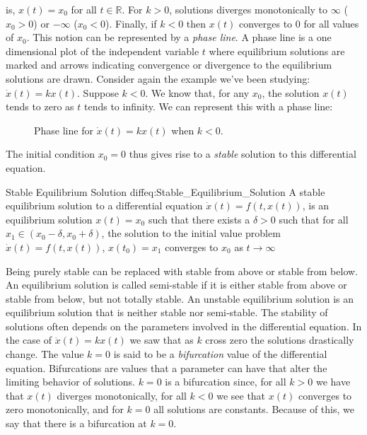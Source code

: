             is, $x(t)=x_{0}$ for all $t\in\mathbb{R}$. For $k>0$,
            solutions diverges monotonically to $\infty$
            ($x_{0}>0$) or $-\infty$ ($x_{0}<0$).
            Finally, if $k<0$ then $x(t)$ converges to $0$
            for all values of $x_{0}$. This notion can be represented
            by a \textit{phase line}. A phase line is a one
            dimensional plot of the independent variable $t$ where
            equilibrium solutions are marked and arrows indicating
            convergence or divergence to the equilibrium solutions
            are drawn. Consider again the example
            we've been studying:
            $\dot{x}(t)=kx(t)$. Suppose $k<0$. We know that, for any
            $x_{0}$, the solution $x(t)$ tends to zero as $t$ tends
            to infinity. We can represent this with a phase line:
            \begin{figure}
                \captionsetup{type=figure}
                \centering
                
                \caption{Phase line for $\dot{x}(t)=kx(t)$
                         when $k<0$.}
                \label{fig:CHAOS:Phase_Line_Example}
            \end{figure}
            The initial condition $x_{0}=0$ thus gives rise to a
            \textit{stable} solution to this differential equation.
            \begin{fdefinition}{Stable Equilibrium Solution}   
                {diffeq:Stable_Equilibrium_Solution}
                A stable equilibrium solution to a differential
                equation $\dot{x}(t)=f(t,x(t))$, is
                an equilibrium solution $x(t)=x_{0}$
                such that there exists a
                $\delta>0$ such that for all
                $x_{1}\in(x_{0}-\delta,x_{0}+\delta)$, the solution
                to the initial value problem
                $\dot{x}(t)=f(t,x(t))$, $x(t_{0})=x_{1}$ converges to
                $x_{0}$ as $t\rightarrow\infty$
            \end{fdefinition}
            Being purely stable can be replaced with stable from above
            or stable from below. An equilibrium solution is called
            semi-stable if it is either stable from above or stable
            from below, but not totally stable. An unstable equilibrium
            solution is an equilibrium solution that is neither stable
            nor semi-stable. The stability of solutions often depends
            on the parameters involved in the differential equation.
            In the case of $\dot{x}(t)=kx(t)$ we saw that as
            $k$ cross zero the solutions drastically change. The
            value $k=0$ is said to be a \textit{bifurcation} value
            of the differential equation. Bifurcations are values that
            a parameter can have that alter the limiting behavior of
            solutions. $k=0$ is a bifurcation since, for all $k>0$
            we have that $x(t)$ diverges monotonically, for all
            $k<0$ we see that $x(t)$ converges to zero monotonically,
            and for $k=0$ all solutions are constants. Because of this,
            we say that there is a bifurcation at $k=0$.
